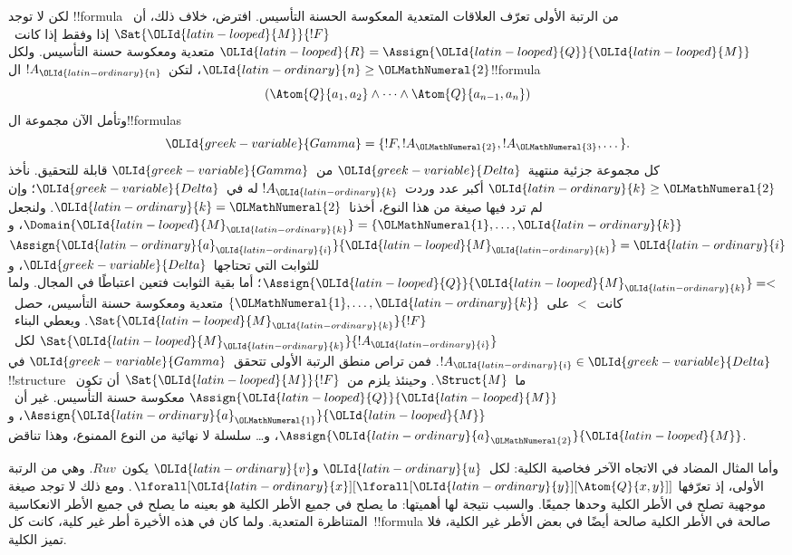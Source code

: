 \documentclass[../../../include/open-logic-section]{subfiles}
\begin{document}
لكن لا توجد !!{formula} من الرتبة الأولى تعرّف العلاقات المتعدية
المعكوسة الحسنة التأسيس. افترض، خلاف ذلك، أن~$\Sat{{\OLId{latin-looped}{M}}}{!F}$ إذا وفقط
إذا كانت~${\OLId{latin-looped}{R}} = \Assign{{\OLId{latin-looped}{Q}}}{{\OLId{latin-looped}{M}}}$ متعدية ومعكوسة حسنة التأسيس. ولكل
${\OLId{latin-ordinary}{n}} \ge {\OLMathNumeral{2}}$، لتكن~$!A_{\OLId{latin-ordinary}{n}}$ ال!!{formula}
\[
(\Atom{Q}{a_1,a_2} \land \dots \land
    \Atom{Q}{a_{n-1},a_{n}})
\]
وتأمل الآن مجموعة ال!!{formula}s
\[
{\OLId{greek-variable}{Gamma}} = \{!F, !A_{\OLMathNumeral{2}}, !A_{\OLMathNumeral{3}}, \dots\}.
\]
كل مجموعة جزئية منتهية~${\OLId{greek-variable}{Delta}}$ من~${\OLId{greek-variable}{Gamma}}$ قابلة للتحقيق. نأخذ
${\OLId{latin-ordinary}{k}} \ge {\OLMathNumeral{2}}$ أكبر عدد وردت~$!A_{\OLId{latin-ordinary}{k}}$ له في~${\OLId{greek-variable}{Delta}}$؛ وإن لم ترد فيها
صيغة من هذا النوع، أخذنا~${\OLId{latin-ordinary}{k}}={\OLMathNumeral{2}}$. ولنجعل
$\Domain{{\OLId{latin-looped}{M}}_{\OLId{latin-ordinary}{k}}} = \{{\OLMathNumeral{1}}, \dots, {\OLId{latin-ordinary}{k}}\}$، و$\Assign{{\OLId{latin-ordinary}{a}}_{\OLId{latin-ordinary}{i}}}{{\OLId{latin-looped}{M}}_{\OLId{latin-ordinary}{k}}} = {\OLId{latin-ordinary}{i}}$
للثوابت التي تحتاجها~${\OLId{greek-variable}{Delta}}$، و$\Assign{{\OLId{latin-looped}{Q}}}{{\OLId{latin-looped}{M}}_{\OLId{latin-ordinary}{k}}} = <$؛
أما بقية الثوابت فتعين اعتباطًا في المجال.
ولما كانت~$<$ على~$\{{\OLMathNumeral{1}}, \dots, {\OLId{latin-ordinary}{k}}\}$ متعدية ومعكوسة حسنة التأسيس،
حصل~$\Sat{{\OLId{latin-looped}{M}}_{\OLId{latin-ordinary}{k}}}{!F}$. ويعطي البناء~$\Sat{{\OLId{latin-looped}{M}}_{\OLId{latin-ordinary}{k}}}{!A_{\OLId{latin-ordinary}{i}}}$
لكل~$!A_{\OLId{latin-ordinary}{i}} \in {\OLId{greek-variable}{Delta}}$. فمن تراص منطق الرتبة الأولى تتحقق~${\OLId{greek-variable}{Gamma}}$
في !!{structure} ما~$\Struct{M}$. وحينئذ يلزم من~$\Sat{{\OLId{latin-looped}{M}}}{!F}$
أن تكون~$\Assign{{\OLId{latin-looped}{Q}}}{{\OLId{latin-looped}{M}}}$ معكوسة حسنة التأسيس.
غير أن~$\Assign{{\OLId{latin-ordinary}{a}}_{\OLMathNumeral{1}}}{{\OLId{latin-looped}{M}}}$، و$\Assign{{\OLId{latin-ordinary}{a}}_{\OLMathNumeral{2}}}{{\OLId{latin-looped}{M}}}$، و\dots{}
سلسلة لا نهائية من النوع الممنوع، وهذا تناقض.

وأما المثال المضاد في الاتجاه الآخر فخاصية الكلية: لكل~${\OLId{latin-ordinary}{u}}$ و${\OLId{latin-ordinary}{v}}$
يكون~$Ruv$. وهي من الرتبة الأولى، إذ تعرّفها
$\lforall[{\OLId{latin-ordinary}{x}}][\lforall[{\OLId{latin-ordinary}{y}}][\Atom{Q}{x,y}]]$. ومع ذلك لا توجد صيغة
موجهية تصلح في الأطر الكلية وحدها جميعًا. والسبب نتيجة لها
أهميتها: ما يصلح في جميع الأطر الكلية هو بعينه ما يصلح في جميع
الأطر الانعكاسية المتناظرة المتعدية. ولما كان في هذه الأخيرة أطر
غير كلية، كانت كل~!!{formula} صالحة في الأطر الكلية صالحة أيضًا
في بعض الأطر غير الكلية، فلا تميز الكلية.
\end{document}
